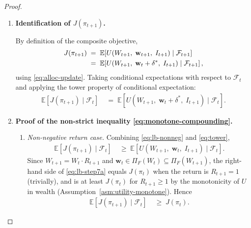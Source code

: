 \documentclass[12pt,openany]{book}
\newcommand{\bfw}{\mathbf{w}}
\newcommand{\calF}{\mathcal{F}}
\newcommand{\calI}{\mathcal{I}}
\newcommand{\E}{\mathbb{E}}
\numberwithin{equation}{chapter}
\theoremstyle{plain}
\theoremstyle{definition}
\theoremstyle{remark}
\numberwithin{equation}{chapter}
\theoremstyle{plain}
\def\calI{I}%
\begin{document}
\begin{proof}
\begin{enumerate}
  \item[\textup{(6)}] \textbf{Identification of $J(\pi_{t+1})$.}

        By definition of the composite objective,
        \begin{align}
          J(\pi_{t+1})
          &\;=\; \E\!\left[
            U(W_{t+1},\; \bfw_{t+1},\; \calI_{t+1})
            \mid \calF_{t+1}
          \right]
          \notag \\
          &\;=\; \E\!\left[
            U(W_{t+1},\; \bfw_t + \delta^*,\; \calI_{t+1})
            \mid \calF_{t+1}
          \right],
          \label{eq:Jt1-def}
        \end{align}
        using \eqref{eq:alloc-update}.  Taking conditional
        expectations with respect to $\calF_t$ and applying
        the tower property of conditional expectation:
        \begin{align}
          \E\!\left[J(\pi_{t+1}) \mid \calF_t\right]
          &\;=\; \E\!\left[
            U(W_{t+1},\; \bfw_t + \delta^*,\; \calI_{t+1})
            \mid \calF_t
          \right].
          \label{eq:tower}
        \end{align}

  \item[\textup{(7)}] \textbf{Proof of the non-strict inequality
        \eqref{eq:monotone-compounding}.}

        \begin{enumerate}
          \item[\textup{(7a)}] \emph{Non-negative return case.}
                Combining \eqref{eq:lb-nonneg} and \eqref{eq:tower},
                \begin{align}
                  \E\!\left[J(\pi_{t+1}) \mid \calF_t\right]
                  &\;\geq\;
                  \E\!\left[
                    U(W_{t+1},\; \bfw_t,\; \calI_{t+1})
                    \mid \calF_t
                  \right].
                  \label{eq:lb-step7a}
                \end{align}
                Since $W_{t+1} = W_t \cdot R_{t+1}$ and
                $\bfw_t \in \Pi_F(W_t) \subseteq \Pi_F(W_{t+1})$,
                the right-hand side of \eqref{eq:lb-step7a} equals
                $J(\pi_t)$ when the return is $R_{t+1} = 1$
                (trivially), and is at least $J(\pi_t)$ for
                $R_{t+1} \geq 1$ by the monotonicity of $U$ in
                wealth (Assumption~\ref{asm:utility-monotone}).
                Hence
                \begin{align}
                  \E\!\left[J(\pi_{t+1}) \mid \calF_t\right]
                  &\;\geq\; J(\pi_t).
                  \label{eq:nonneg-result}
                \end{align}


\end{enumerate}
\end{enumerate}
\end{proof}
\end{document}
